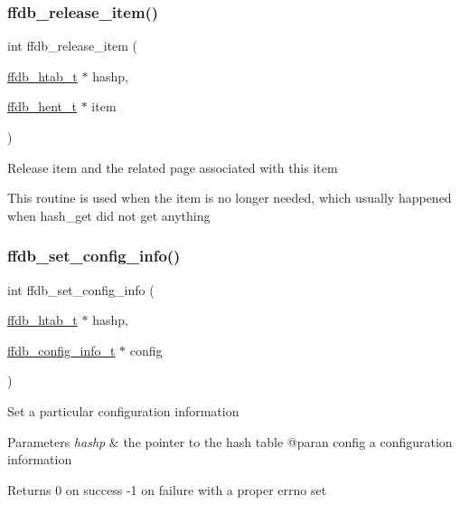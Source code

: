\subsubsection{\texorpdfstring{ffdb\_release\_item()}{ffdb\_release\_item()}}
{\footnotesize\ttfamily int ffdb\+\_\+release\+\_\+item (\begin{DoxyParamCaption}\item[{\mbox{\hyperlink{adat-devel_2other__libs_2filedb_2filehash_2ffdb__hash_8h_ae592010ed2bedc975d3cc0b7d074b9d1}{ffdb\+\_\+htab\+\_\+t}} $\ast$}]{hashp,  }\item[{\mbox{\hyperlink{adat-devel_2other__libs_2filedb_2filehash_2ffdb__hash_8h_aa1cea5ccbd6513ed152988f7a71a936d}{ffdb\+\_\+hent\+\_\+t}} $\ast$}]{item }\end{DoxyParamCaption})}

Release item and the related page associated with this item

This routine is used when the item is no longer needed, which usually happened when hash\+\_\+get did not get anything \mbox{\label{adat-devel_2other__libs_2filedb_2filehash_2ffdb__page_8c_a187d2e04a74842fa855ee5799174d260}} 
\subsubsection{\texorpdfstring{ffdb\_set\_config\_info()}{ffdb\_set\_config\_info()}}
{\footnotesize\ttfamily int ffdb\+\_\+set\+\_\+config\+\_\+info (\begin{DoxyParamCaption}\item[{\mbox{\hyperlink{adat-devel_2other__libs_2filedb_2filehash_2ffdb__hash_8h_ae592010ed2bedc975d3cc0b7d074b9d1}{ffdb\+\_\+htab\+\_\+t}} $\ast$}]{hashp,  }\item[{\mbox{\hyperlink{adat-devel_2other__libs_2filedb_2filehash_2ffdb__db_8h_acc961fbd2faf6a849a1620309100fda1}{ffdb\+\_\+config\+\_\+info\+\_\+t}} $\ast$}]{config }\end{DoxyParamCaption})}

Set a particular configuration information 
\begin{DoxyParams}{Parameters}
{\em hashp} & the pointer to the hash table @paran config a configuration information\\
\hline
\end{DoxyParams}
\begin{DoxyReturn}{Returns}
0 on success -\/1 on failure with a proper errno set 
\end{DoxyReturn}
\mbox{\label{adat-devel_2other__libs_2filedb_2filehash_2ffdb__page_8c_a57a72b4c0d4aaeef58f11a8c96f5b572}} 
